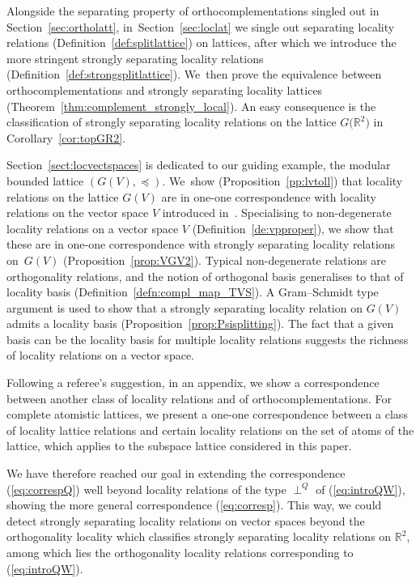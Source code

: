 \documentclass[10pt,a4paper]{amsart}
\numberwithin{equation}{section}
\newcommand{\R}{\mathbb{R}}
\newcommand{\loc}{locality\xspace}
\newcommand{\pone}{separating\xspace }
\begin{document}
Alongside the separating property of orthocomplementations singled out in Section~\ref{sec:ortholatt}, in~Sec\-tion~\ref{sec:loclat} we single out separating locality relations (Definition~\ref{def:splitlattice}) on lattices, after which we introduce the more stringent strongly separating locality relations (Definition~\ref{def:strongsplitlattice}). We~then prove the equivalence between orthocomplementations and strongly separating locality lattices (Theorem~\ref{thm:complement_strongly_local}). An easy consequence is the classification of strongly separating locality relations on the lattice $G\big(\R^2\big)$ in Corollary~\ref{cor:topGR2}.

Section~\ref{sect:locvectspaces} is dedicated to our guiding example, the modular bounded lattice $(G(V), \preceq)$. We~show (Proposition~\ref{pp:lvtoll}) that locality relations on the lattice $G(V)$ are in one-one correspondence with locality relations on the vector space $V$ introduced in~\cite{CGPZ1}.
	Specialising to non-degenerate locality relations on a vector space $V$ (Definition~\ref{de:vpproper}), we show that these are in one-one correspondence with strongly separating locality relations on~$G(V)$ (Proposition~\ref{prop:VGV2}). Typical non-degenerate relations are orthogonality relations, and the notion of orthogonal basis generalises to that of locality basis (Definition~\ref{defn:compl_map_TVS}). A Gram--Schmidt type argument is used to show that a strongly \pone \loc relation on $G(V)$ admits a \loc basis (Proposition~\ref{prop:Psisplitting}). The fact that a given basis can be the \loc basis for multiple \loc relations suggests the richness of locality relations on a vector space.
	

	Following a referee's suggestion, in an appendix, we show a correspondence between another class of locality relations and of orthocomplementations. For complete atomistic lattices, we present a one-one correspondence between a class of locality lattice relations and certain locality relations on the set of atoms of the lattice, which applies to the subspace lattice considered in this paper.

We have therefore reached our goal in extending the correspondence (\ref{eq:correspQ}) well beyond loca\-lity relations of the type $\perp^Q$
of (\ref{eq:introQW}), showing the more general correspondence (\ref{eq:corresp}).
This way, we could detect strongly
\pone \loc relations on vector spaces beyond the ortho\-go\-na\-lity \loc which classifies strongly \pone \loc relations on $\R^2$, among which lies the orthogonality \loc relations corresponding to
(\ref{eq:introQW}).
\end{document}
